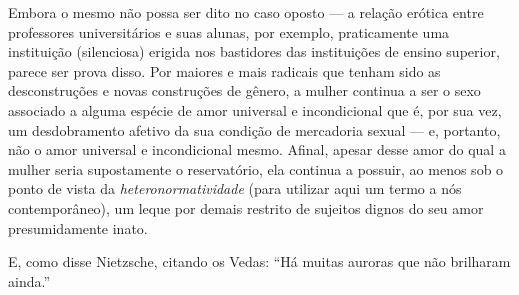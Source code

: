 Embora o mesmo não possa ser dito no caso oposto --- a relação
erótica entre professores universitários e suas alunas, por exemplo,
praticamente uma instituição (silenciosa) erigida nos bastidores das
instituições de ensino superior, parece ser prova disso. Por maiores e
mais radicais que tenham sido as desconstruções e novas construções de
gênero, a mulher continua a ser o sexo associado a alguma espécie de
amor universal e incondicional que é, por sua vez, um desdobramento
afetivo da sua condição de mercadoria sexual --- e, portanto, não o amor
universal e incondicional mesmo. Afinal, apesar desse amor do qual a
mulher seria supostamente o reservatório, ela continua a possuir, ao
menos sob o ponto de vista da \textit{heteronormatividade} (para utilizar aqui um
termo a nós contemporâneo), um leque por demais restrito de sujeitos
dignos do seu amor presumidamente inato.

E, como disse Nietzsche, citando os Vedas: ``Há muitas auroras que não
brilharam ainda.''

